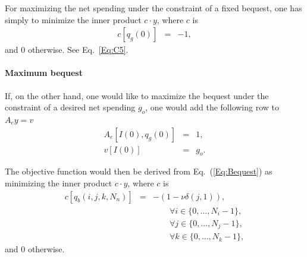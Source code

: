 \documentclass{report}[fleqn,12pt]
\begin{document}
For maximizing the net spending under the constraint of a fixed bequest, one has simply to
minimize the inner product $c\cdot y$, where $c$ is
\begin{eqnarray}
	c[q_g(0)] &=& -1,
\end{eqnarray}
and 0 otherwise. See Eq.~\ref{Eq:C5}.

\paragraph*{Maximum bequest}
If, on the other hand, one would like to maximize the bequest under the constraint of a desired net spending $g_o$,
one would add the following row to $A_ey = v$
\begin{eqnarray}
	\label{Eq:FixedIncome}
	A_e[I(0), q_g(0)] &=& 1, \nonumber \\
	v[I(0)] &=& g_o.
\end{eqnarray}

The objective function would then be derived from Eq.~(\ref{Eq:Bequest}) as
minimizing the inner product $c\cdot y$, where $c$ is
\begin{eqnarray}
	\label{Eq:MaxBequest}
	c[q_b(i, j, k, N_n)] &=& -(1 - \nu\delta(j, 1)),\\
	&&\qquad\forall i \in \{0,\ldots, N_i-1\},\nonumber\\
	&&\qquad\forall j \in \{0,\ldots, N_j-1\},\nonumber\\
	&&\qquad\forall k \in \{0,\ldots, N_k-1\},\nonumber
\end{eqnarray}
and 0 otherwise.
\end{document}
